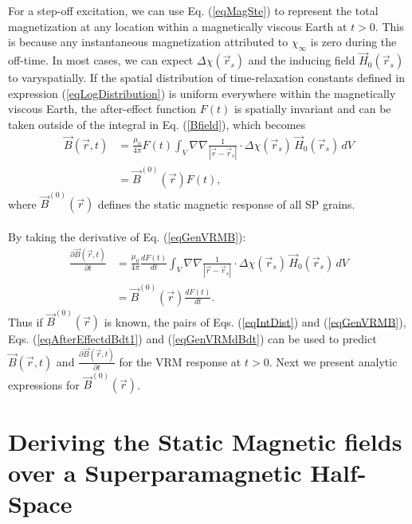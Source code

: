 \documentclass[onecolumn]{IEEEtran} %
\begin{document}
For a step-off excitation, we can use Eq. (\ref{eqMagSte})  to represent the total magnetization at any location within a magnetically viscous Earth at $t > 0$. This is because any instantaneous magnetization attributed to $\chi_\infty$ is zero during the off-time. In most cases, we can expect $\Delta \chi(\vec r_s)$ and the inducing field $\vec H_0(\vec r_s)$ to varyspatially. If the spatial distribution of time-relaxation constants defined in expression (\ref{eqLogDistribution}) is uniform everywhere within the magnetically viscous Earth, the after-effect function $F(t)$ is spatially invariant and can be taken outside of the integral in Eq. (\ref{Bfield}), which becomes
\begin{align}
\vec B(\vec r,t) &= \frac{\mu_0}{4 \pi} F(t) \int_V \nabla \nabla \frac{1}{| \vec r - \vec r_s |} \cdot \Delta \chi(\vec r_s) \, \vec H_0(\vec r_s) \, dV \nonumber \\
&= \vec B^{(0)} (\vec r) F(t), \label{eqGenVRMB}
\end{align}
where $\vec B^{(0)}(\vec r)$ defines  the static magnetic response of all SP grains.
\\\\
By taking the derivative of Eq. (\ref{eqGenVRMB}):
\begin{align}
\frac{\partial \vec B(\vec r,t)}{\partial t} &= \frac{\mu_0}{4 \pi} \frac{d F(t)}{dt} \int_V \nabla \nabla \frac{1}{| \vec r - \vec r_s |} \cdot \Delta \chi(\vec r_s) \, \vec H_0(\vec r_s) \, dV \nonumber \\
&= \vec B^{(0)} (\vec r) \frac{d F(t)}{dt}. \label{eqGenVRMdBdt}
\end{align}
Thus if $\vec B^{(0)}(\vec r)$ is known, the pairs of Eqs. (\ref{eqIntDist}) and (\ref{eqGenVRMB}), Eqs. (\ref{eqAfterEffectdBdt1}) and (\ref{eqGenVRMdBdt}) can be used to predict $\vec B(\vec r,t)$ and $\frac{\partial \vec B(\vec r,t)}{\partial t}$ for the VRM response at $t > 0$. Next we present analytic expressions for $\vec B^{(0)} (\vec r)$.


\section{Deriving the Static Magnetic fields over a Superparamagnetic Half-Space}
\label{secMagnetostatic}
\end{document}
